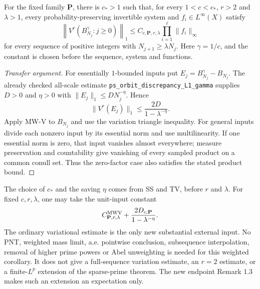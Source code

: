 \begin{theorem}\label{c:long-variation}
\leanok
For the fixed family $\mathbf P$, there is $c_*>1$ such that, for every
$1<c<c_*$, $r>2$ and $\lambda>1$, every probability-preserving invertible
system and $f_i\in L^\infty(X)$ satisfy
\[
 \left\|V^r(B_{N_j}^\gamma:j\geq0)\right\|_1
 \leq C_{c,\mathbf P,r,\lambda}\prod_{i=1}^\ell\|f_i\|_\infty
\]
for every sequence of positive integers with
$N_{j+1}\geq\lambda N_j$. Here $\gamma=1/c$, and the constant is chosen
before the sequence, system and functions.
\end{theorem}
\begin{proof}[Transfer argument]
\leanok
{}
For essentially $1$-bounded inputs put $E_j=B_{N_j}^\gamma-B_{N_j}$.
The already checked all-scale estimate
\texttt{ps\_orbit\_discrepancy\_L1\_gamma} supplies $D>0$ and
$\eta>0$ with $\|E_j\|_1\leq DN_j^{-\eta}$. Hence
\[
 \|V^r(E_j)\|_1\leq
 \frac{2D}{1-\lambda^{-\eta}}.
\]
Apply MW-V to $B_{N_j}$ and use the variation triangle inequality.
For general inputs divide each nonzero input by its essential norm and
use multilinearity. If one essential norm is zero, that input vanishes
almost everywhere; measure preservation and countability give vanishing
of every sampled product on a common conull set. Thus the zero-factor
case also satisfies the stated product bound.
\end{proof}
\ifDetailed
The choice of $c_*$ and the saving $\eta$ comes from SS and TV, before
$r$ and $\lambda$. For fixed $c,r,\lambda$, one may take the unit-input
constant
\[
 C_{\mathbf P,r,\lambda}^{\rm MWV}
 +\frac{2D_{c,\mathbf P}}{1-\lambda^{-\eta}}.
\]
The ordinary variational estimate is the only new substantial external
input. No PNT, weighted mass limit, a.e. pointwise conclusion,
subsequence interpolation, removal of higher prime powers or Abel
unweighting is needed for this weighted corollary. It does not give a
full-sequence variation estimate, an $r=2$ estimate, or a finite-$L^p$
extension of the sparse-prime theorem. The new endpoint Remark 1.3 makes
such an extension an expectation only.
\fi
